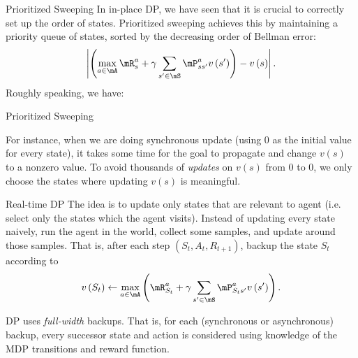 \documentclass[RL]{subfiles}
\begin{document}
    \begin{boxy}{\stfont Prioritized Sweeping}
        In in-place DP, we have seen that it is crucial to correctly set up the order of states. Prioritized sweeping achieves this by maintaining a priority queue of states, sorted by the decreasing order of Bellman error:
        \begin{equation}
            \left| \left( \max_{a\in\mA} \mR^a_s + \gamma\sum^{}_{s'\in\mS}\mP^a_{ss'}v\left( s' \right) \right) - v\left( s \right) \right|.
        \end{equation}
        Roughly speaking, we have:

        \begin{algorithm}{Prioritized Sweeping}
        \end{algorithm}
        \clearpage

        \np For instance, when we are doing synchronous update (using $0$ as the initial value for every state), it takes some time for the goal to propagate and change $v\left( s \right)$ to a nonzero value. To avoid thousands of \textit{updates} on $v\left( s \right)$ from $0$ to $0$, we only choose the  states where updating $v\left( s \right)$ is meaningful.
    \end{boxy}
    
    \begin{boxy}{\stfont Real-time DP}
        The idea is to update only states that are relevant to agent (i.e. select only the states which the agent visits). Instead of updating every state naively, run the agent in the world, collect some samples, and update around those samples. That is, after each step $\left( S_t,A_t,R_{t+1} \right)$, backup the state $S_t$ according to
        \begin{equation}
            v\left( S_t \right) \leftarrow \max_{a\in\mA} \left( \mR^a_{S_t}+\gamma\sum^{}_{s'\in\mS}\mP^a_{S_ts'}v\left( s' \right) \right).
        \end{equation}
    \end{boxy}
    
    \np DP uses \textit{full-width} backups. That is, for each (synchronous or asynchronous) backup, every successor state and action is considered using knowledge of the MDP transitions and reward function.
\end{document}
